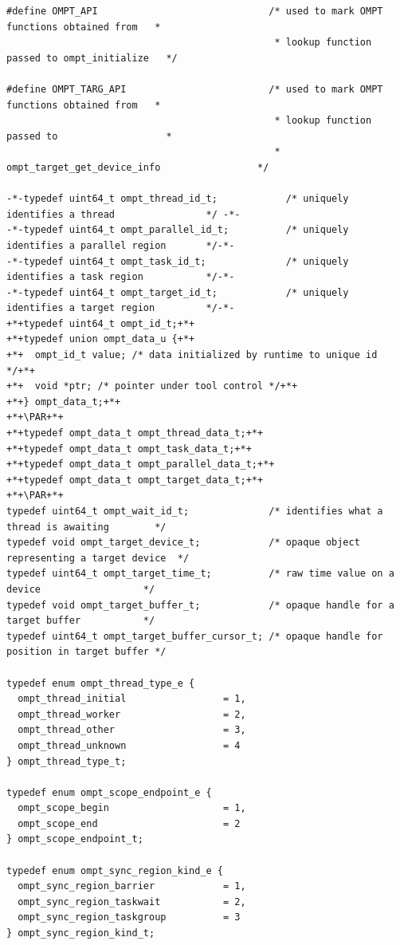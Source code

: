 \documentclass{article}
\begin{document}
\begin{lstlisting}
#define OMPT_API                              /* used to mark OMPT functions obtained from   *
                                               * lookup function passed to ompt_initialize   */ 

#define OMPT_TARG_API                         /* used to mark OMPT functions obtained from   *
                                               * lookup function passed to                   *
                                               * ompt_target_get_device_info                 */

-*-typedef uint64_t ompt_thread_id_t;            /* uniquely identifies a thread                */ -*-
-*-typedef uint64_t ompt_parallel_id_t;          /* uniquely identifies a parallel region       */-*-
-*-typedef uint64_t ompt_task_id_t;              /* uniquely identifies a task region           */-*-
-*-typedef uint64_t ompt_target_id_t;            /* uniquely identifies a target region         */-*-
+*+typedef uint64_t ompt_id_t;+*+
+*+typedef union ompt_data_u {+*+
+*+  ompt_id_t value; /* data initialized by runtime to unique id */+*+
+*+  void *ptr; /* pointer under tool control */+*+
+*+} ompt_data_t;+*+
+*+\PAR+*+
+*+typedef ompt_data_t ompt_thread_data_t;+*+
+*+typedef ompt_data_t ompt_task_data_t;+*+
+*+typedef ompt_data_t ompt_parallel_data_t;+*+
+*+typedef ompt_data_t ompt_target_data_t;+*+
+*+\PAR+*+
typedef uint64_t ompt_wait_id_t;              /* identifies what a thread is awaiting        */
typedef void ompt_target_device_t;            /* opaque object representing a target device  */
typedef uint64_t ompt_target_time_t;          /* raw time value on a device                  */
typedef void ompt_target_buffer_t;            /* opaque handle for a target buffer           */ 
typedef uint64_t ompt_target_buffer_cursor_t; /* opaque handle for position in target buffer */

typedef enum ompt_thread_type_e {
  ompt_thread_initial                 = 1,
  ompt_thread_worker                  = 2,
  ompt_thread_other                   = 3,
  ompt_thread_unknown                 = 4
} ompt_thread_type_t;

typedef enum ompt_scope_endpoint_e {
  ompt_scope_begin                    = 1,
  ompt_scope_end                      = 2
} ompt_scope_endpoint_t;

typedef enum ompt_sync_region_kind_e {
  ompt_sync_region_barrier            = 1, 
  ompt_sync_region_taskwait           = 2,
  ompt_sync_region_taskgroup          = 3
} ompt_sync_region_kind_t;


\end{lstlisting}
\end{document}
